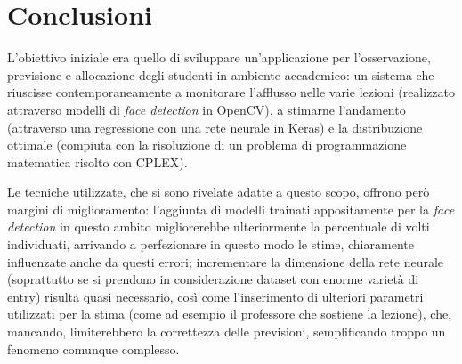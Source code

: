 \chapter{Conclusioni}
\label{section:conclusion}

L'obiettivo iniziale era quello di sviluppare un'applicazione per l'osservazione, previsione e 
allocazione degli studenti in ambiente accademico: un sistema che riuscisse contemporaneamente a 
monitorare l'afflusso nelle varie lezioni (realizzato attraverso modelli di \textit{face detection} 
in OpenCV), a stimarne l'andamento (attraverso una regressione con una rete neurale in Keras) e 
la distribuzione ottimale (compiuta con la risoluzione di un problema di programmazione matematica
risolto con CPLEX).

\smallskip

Le tecniche utilizzate, che si sono rivelate adatte a questo scopo, offrono però margini di miglioramento:
l'aggiunta di modelli trainati appositamente per la \textit{face detection} in questo ambito migliorerebbe 
ulteriormente la percentuale di volti individuati, arrivando a perfezionare in questo modo le stime,
chiaramente influenzate anche da questi errori; incrementare la dimensione della rete neurale (soprattutto se si 
prendono in considerazione dataset con enorme varietà di entry) risulta quasi necessario, così come 
l'inserimento di ulteriori parametri utilizzati per la stima (come ad esempio il professore che sostiene 
la lezione), che, mancando, limiterebbero la correttezza delle previsioni, semplificando troppo
un fenomeno comunque complesso.

